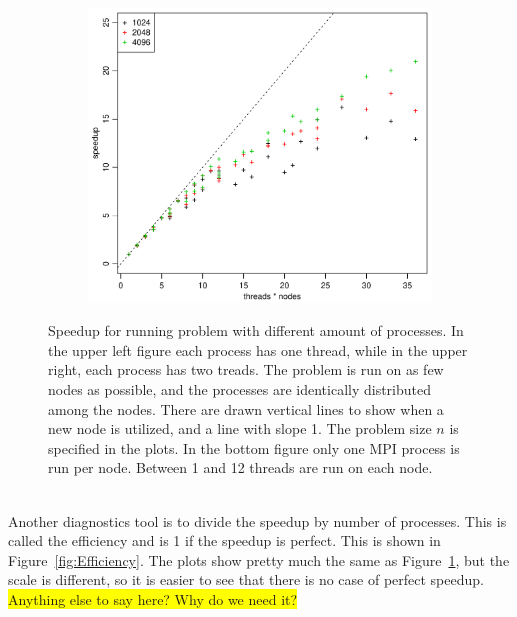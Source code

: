 \begin{figure}[h!]
  \quad
  \begin{subfigure}[b]{0.48\textwidth}
    \includegraphics[width=\textwidth]{./Figures/taskbSpeedupNodesTimesThreads.pdf}
  \end{subfigure}
  \vspace{-0.1\baselineskip}
  \caption{Speedup for running problem with different amount of processes. In the upper left figure each process has one thread, while in the upper right, each process has two treads. The problem is run on as few nodes as possible, and the processes are identically distributed among the nodes. There are drawn vertical lines to show when a new node is utilized, and a line with slope 1. The problem size $n$ is specified in the plots. In the bottom figure only one MPI process is run per node. Between 1 and 12 threads are run on each node.}
  \label{fig:Speedup}
\end{figure}
%
\\
Another diagnostics tool is to divide the speedup by number of processes. This is called the efficiency and is 1 if the speedup is perfect. This is shown in Figure~\ref{fig:Efficiency}. The plots show pretty much the same as Figure~\ref{fig:Speedup}, but the scale is different, so it is easier to see that there is no case of perfect speedup.
\\\colorbox{yellow}{Anything else to say here? Why do we need it?}
\\
